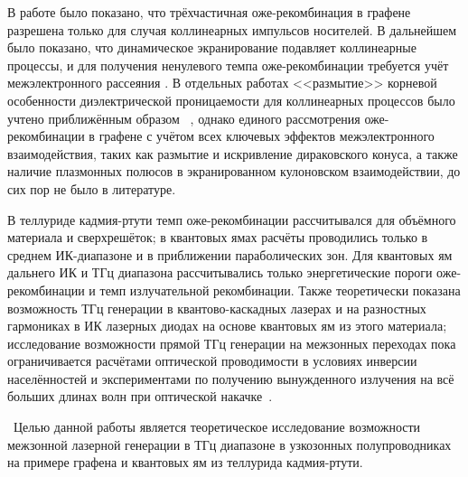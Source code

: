 В работе \cite{Rana-Auger} было показано, что трёхчастичная оже-рекомбинация в графене разрешена только для случая коллинеарных импульсов носителей. В дальнейшем было показано, что динамическое экранирование подавляет коллинеарные процессы, и для получения ненулевого темпа оже-рекомбинации требуется учёт межэлектронного рассеяния \cite{Tomadin-theory}. В отдельных работах <<размытие>> корневой особенности диэлектрической проницаемости для коллинеарных процессов было учтено приближённым образом ~\cite{Malic-dynamic,Tomadin-theory}, однако единого рассмотрения оже-рекомбинации в графене с учётом всех ключевых эффектов межэлектронного взаимодействия, таких как размытие и искривление дираковского конуса, а также наличие плазмонных полюсов в экранированном кулоновском взаимодействии, до сих пор не было в литературе.

В теллуриде кадмия-ртути темп оже-рекомбинации рассчитывался для объёмного материала и сверхрешёток; в квантовых ямах расчёты проводились только в среднем ИК-диапазоне и в приближении параболических зон. Для квантовых ям дальнего ИК и ТГц диапазона рассчитывались только энергетические пороги оже-рекомбинации и темп излучательной рекомбинации. Также теоретически показана возможность ТГц генерации в квантово-каскадных лазерах и на разностных гармониках в ИК лазерных диодах на основе квантовых ям из этого материала; исследование возможности прямой ТГц генерации на межзонных переходах пока ограничивается расчётами оптической проводимости в условиях инверсии населённостей и экспериментами по получению вынужденного излучения на всё больших длинах волн при оптической накачке~\cite{HgCdTe-stimulated_emission}.

\aimsandtasks\ 
Целью данной работы является теоретическое исследование возможности межзонной лазерной генерации в ТГц диапазоне в узкозонных полупроводниках на примере графена и квантовых ям из теллурида кадмия-ртути.

